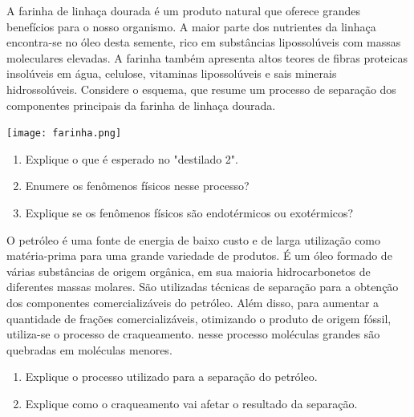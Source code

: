\documentclass[a4paper,12]{exam}
\begin{document}
\begin{multicols}{2}
  	\begin{questions}
	  \question A farinha de linhaça dourada é um produto natural que
	  oferece grandes benefícios para o nosso organismo. A maior
	  parte dos nutrientes da linhaça encontra-se no óleo desta
	  semente, rico em substâncias lipossolúveis com massas
	  moleculares elevadas. A farinha também apresenta altos
teores de fibras proteicas insolúveis em água, celulose,
	  vitaminas lipossolúveis e sais minerais hidrossolúveis.
	  Considere o esquema, que resume um processo de
	  separação dos componentes principais da farinha de 
	  linhaça dourada. 
	  
	  \texttt{[image: farinha.png]}
		
		\begin{enumerate}[label=\alph*)]
	  	\item Explique o que é esperado no "destilado 2".
	  	\fillwithlines{8em}
	   	\item Enumere os fenômenos físicos nesse processo? 
	   	\fillwithlines{8em}
	   	\item Explique se os fenômenos físicos são endotérmicos ou exotérmicos?
	   	\fillwithlines{8em}
		\end{enumerate}
	
	
	  \question O petróleo é uma fonte de energia de baixo custo
	  e de larga utilização como matéria-prima para uma 
	  grande variedade de produtos. É um óleo formado
	  de várias substâncias de origem orgânica, em sua
	  maioria hidrocarbonetos de diferentes massas molares.
	  São utilizadas técnicas de separação para a obtenção
	  dos componentes comercializáveis do petróleo.
	  Além disso, para aumentar a quantidade de frações
	  comercializáveis, otimizando o produto de origem fóssil,
	  utiliza-se o processo de craqueamento. nesse processo moléculas grandes são quebradas em moléculas menores. 
	  
	  \begin{enumerate}[label=\alph*)]
	  \item Explique o processo utilizado para a separação do petróleo.
	  \fillwithlines{8em}
	  \item Explique como o craqueamento vai afetar o resultado da separação.
	  \fillwithlines{8em}
	  \end{enumerate}	
		
	 \end{questions}
\end{multicols}
\end{document}
